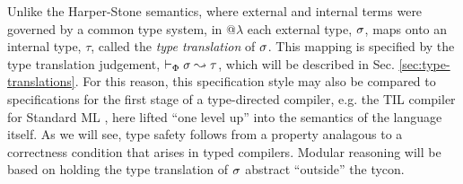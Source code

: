 \documentclass[10pt,preprint]{sigplanconf}
\begin{document}
Unlike the Harper-Stone semantics, where external and internal terms were governed by a common type system, in @$\lambda$ each external type, $\sigma$, maps onto an internal type, $\tau$, called the \emph{type translation} of $\sigma$. This mapping is specified by the  type translation judgement, $\vdash_\Phi \sigma \leadsto \tau$, which will be described in Sec. \ref{sec:type-translations}. 
For this reason, this specification style may also be compared to specifications for the first stage of a type-directed compiler, e.g. the TIL compiler for Standard ML \cite{tarditi+:til-OLD}, here lifted ``one level up'' into the semantics of the language itself. As we will see, type safety follows from a property analagous to a correctness condition that arises in typed compilers. Modular reasoning will be based on holding the type translation of $\sigma$ abstract ``outside'' the tycon.
\end{document}
